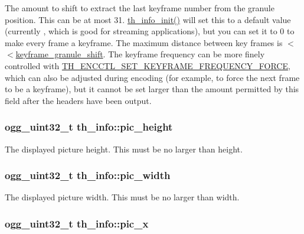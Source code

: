 The amount to shift to extract the last keyframe number from the granule position. This can be at most 31. \hyperlink{group__basefuncs_ga430d9c605816a6ca0bdce3a0b965b926}{th\+\_\+info\+\_\+init()} will set this to a default value (currently {}, which is good for streaming applications), but you can set it to 0 to make every frame a keyframe. The maximum distance between key frames is {$<$$<$\hyperlink{structth__info_a693ca4ab11fbc0c3f32594b4bb8766ed}{keyframe\+\_\+granule\+\_\+shift}}. The keyframe frequency can be more finely controlled with \hyperlink{theoraenc_8h_a27e755e15b4b5604c54974b304037a49}{T\+H\+\_\+\+E\+N\+C\+C\+T\+L\+\_\+\+S\+E\+T\+\_\+\+K\+E\+Y\+F\+R\+A\+M\+E\+\_\+\+F\+R\+E\+Q\+U\+E\+N\+C\+Y\+\_\+\+F\+O\+R\+C\+E}, which can also be adjusted during encoding (for example, to force the next frame to be a keyframe), but it cannot be set larger than the amount permitted by this field after the headers have been output. \hypertarget{structth__info_a775178474283c5990ba73f9ba7f6b88b}{
\subsubsection[{pic\+\_\+height}]{\setlength{\rightskip}{0pt plus 5cm}ogg\+\_\+uint32\+\_\+t th\+\_\+info\+::pic\+\_\+height}}\label{structth__info_a775178474283c5990ba73f9ba7f6b88b}
The displayed picture height. This must be no larger than height. \hypertarget{structth__info_a5048edf77b141dd3e9a92ca85e317345}{
\subsubsection[{pic\+\_\+width}]{\setlength{\rightskip}{0pt plus 5cm}ogg\+\_\+uint32\+\_\+t th\+\_\+info\+::pic\+\_\+width}}\label{structth__info_a5048edf77b141dd3e9a92ca85e317345}
The displayed picture width. This must be no larger than width. \hypertarget{structth__info_a5b3f834bcf141564e7bb14f49101870f}{
\subsubsection[{pic\+\_\+x}]{\setlength{\rightskip}{0pt plus 5cm}ogg\+\_\+uint32\+\_\+t th\+\_\+info\+::pic\+\_\+x}}\label{structth__info_a5b3f834bcf141564e7bb14f49101870f}
